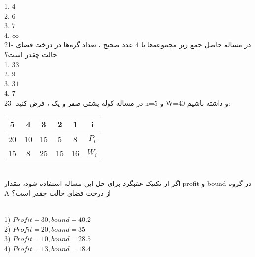 \documentclass{book}
\begin{document}
1. $4$\\
2. $6$\\
3. $7$ \\
4. $\infty$\\


21- در مساله حاصل جمع زیر مجموعه‌ها با 4 عدد صحیح ، تعداد گره‌ها در درخت فضای حالت چقدر است؟\\

1. $33$\\
2. $9$ \\
3. $31$ \\
4. $7$ \\

23- در مساله کوله پشتی صفر و یک ، فرض کنید n=5 و W=40 و داشته باشیم:\\

\begin{table}[htp]
\renewcommand{\arraystretch}{1.5}
\begin{tabular}{c|c|c|c|c|c}
\hline
 5&4&3&2&1&i\\ 
\hline
20&10&15&5&8&$P_i $\\
\hline
15 & 8& 25& 15 &16 &$W_i$\\
\hline
\end{tabular}
\end{table}\\

اگر از تکنیک عقبگرد برای حل این مساله استفاده شود، مقدار profit و bound در گروه A از درخت فضای حالت چقدر است؟\\


\]\\
1)  $Profit = 30, bound = 40.2$\\
2) $Profit = 20, bound = 35$\\
3) $Profit = 10, bound = 28.5$\\
4) $Profit = 13, bound = 18.4$\\
 
\end{document}
